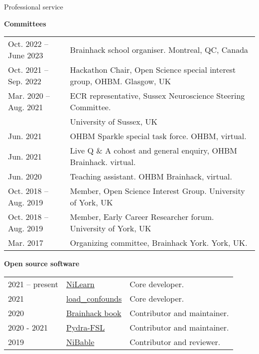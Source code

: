 \documentclass{resume} %
\begin{document}
\begin{rSection}{Professional service}

\textbf{Committees}

\begin{tabular}{@{} l l @{\hspace{6ex}}}
  Oct. 2022 -- June 2023 & Brainhack school organiser. Montreal, QC, Canada \\
  Oct. 2021 -- Sep. 2022 & Hackathon Chair, Open Science special interest group, OHBM. Glasgow, UK \\
  Mar. 2020 -- Aug. 2021 & ECR representative, Sussex Neuroscience Steering Committee. \\
   & University of Sussex, UK\\
  Jun. 2021 & OHBM Sparkle special task force. OHBM, virtual. \\
  Jun. 2021 & Live Q \& A cohost and general enquiry, OHBM Brainhack. virtual. \\
  Jun. 2020 & Teaching assistant. OHBM Brainhack, virtual. \\
  Oct. 2018 -- Aug. 2019 & Member, Open Science Interest Group. University of York, UK\\
  Oct. 2018 -- Aug. 2019 & Member, Early Career Researcher forum. University of York, UK\\
  Mar. 2017 & Organizing committee, Brainhack York. York, UK.\\
\end{tabular}

\textbf{Open source software}

\begin{tabular}{@{} l l l @{\hspace{6ex}}}
  2021 -- present & \href{https://github.com/nilearn/nilearn}{NiLearn} & Core developer.\\
  2021 & \href{https://github.com/SIMEXP/load_confounds}{load\_confounds} & Core developer.\\
  2020 & \href{https://github.com/brainhackorg/brainhack_jupyter_book}{Brainhack book} & Contributor and maintainer. \\
  2020 - 2021 & \href{https://github.com/nipype/pydra-fsl}{Pydra-FSL} & Contributor and maintainer. \\
  2019 & \href{https://github.com/nipy/nibabel/pull/793}{NiBable} & Contributor and reviewer.\\
\end{tabular}


\end{rSection}
\end{document}
